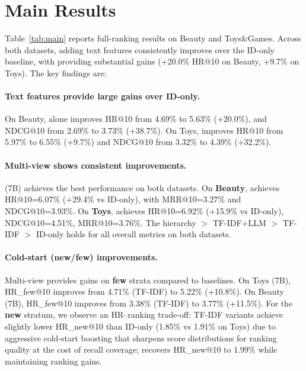 \section{Main Results}
Table~\ref{tab:main} reports full-ranking results on Beauty
and Toys\&Games. Across both datasets, adding text features
consistently improves over the ID-only baseline, with \tfidf
providing substantial gains (+20.0\% HR@10 on Beauty, +9.7\%
on Toys). The key findings are:

\paragraph{Text features provide large gains over ID-only.}
On Beauty, \tfidf alone improves HR@10 from 4.69\% to 5.63\%
(+20.0\%), and NDCG@10 from 2.69\% to 3.73\% (+38.7\%). On
Toys, \tfidf improves HR@10 from 5.97\% to 6.55\% (+9.7\%)
and NDCG@10 from 3.32\% to 4.39\% (+32.2\%).


\paragraph{Multi-view shows consistent improvements.}
\model (7B) achieves the best performance on both datasets.
On \textbf{Beauty}, \model achieves HR@10=6.07\% (+29.4\% vs
ID-only), with MRR@10=3.27\% and NDCG@10=3.93\%. On
\textbf{Toys}, \model achieves HR@10=6.92\% (+15.9\% vs
ID-only), NDCG@10=4.51\%, MRR@10=3.76\%. The hierarchy
\model $>$ TF-IDF+LLM $>$ TF-IDF $>$ ID-only holds for all
overall metrics on both datasets.

\paragraph{Cold-start (new/few) improvements.}
Multi-view provides gains on \textbf{few} strata compared
to baselines. On Toys (7B), HR\_few@10 improves from 4.71\%
(TF-IDF) to 5.22\% (+10.8\%). On Beauty (7B), HR\_few@10
improves from 3.38\% (TF-IDF) to 3.77\% (+11.5\%). For the
\textbf{new} stratum, we observe an HR--ranking trade-off:
TF-IDF variants achieve slightly lower HR\_new@10 than
ID-only (1.85\% vs 1.91\% on Toys) due to aggressive
cold-start boosting that sharpens score distributions for
ranking quality at the cost of recall coverage; \model
recovers HR\_new@10 to 1.99\% while maintaining ranking gains.


